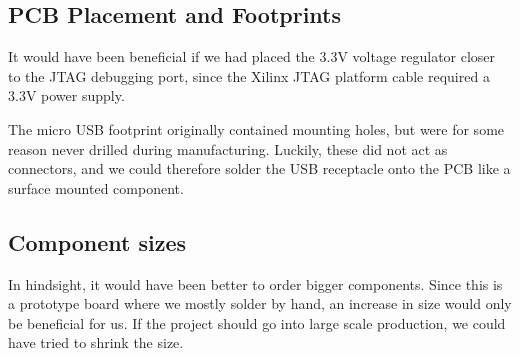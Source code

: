 \subsection{PCB Placement and Footprints}
It would have been beneficial if we had placed the 3.3V voltage regulator closer to the JTAG debugging port, since the Xilinx JTAG platform cable required a 3.3V power supply.

The micro USB footprint originally contained mounting holes, but were for some reason never drilled during manufacturing. Luckily, these did not act as connectors, and we could therefore solder the USB receptacle onto the PCB like a surface mounted component.

\subsection{Component sizes}
In hindsight, it would have been better to order bigger components. Since this is a prototype board where we mostly solder by hand, an increase in size would only be beneficial for us. If the project should go into large scale production, we could have tried to shrink the size.